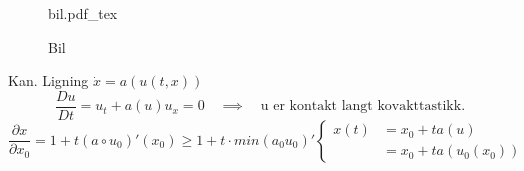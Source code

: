 \documentclass{article}
\newcommand{\incfig}[2][1]{%
\def\svgwidth{#1\columnwidth}
{#2.pdf_tex} } \pdfsuppresswarningpagegroup=1
\theoremstyle{remark}
\begin{document}
\begin{figure}[ht]
    \centering
    \incfig{bil}
    \caption{Bil}
    \label{fig:bil}
\end{figure}

Kan. Ligning $\dot{x} = a\left( u\left( t,x \right) \right)$ \[
\frac{Du}{Dt}  = u_{t}  +  a\left( u \right) u_{x} = 0 \quad  \implies  \quad  \text{u er kontakt langt kovakttastikk.}
\] 
\[
  \frac{\partial x}{\partial x_{0}}  = 1 + t\left( a \circ u_{0} \right)' \left( x_{0} \right) \ge 1+ t\cdot  min\left( a_{0 } u_{0}  \right)'
  \begin{cases}
x\left( t \right)  & = x_{0} + t a\left( u \right) \\
&= x_{0} + t a\left( u_{0} \left( x_{0} \right) \right) 
  \end{cases}
\] 








\end{document}
